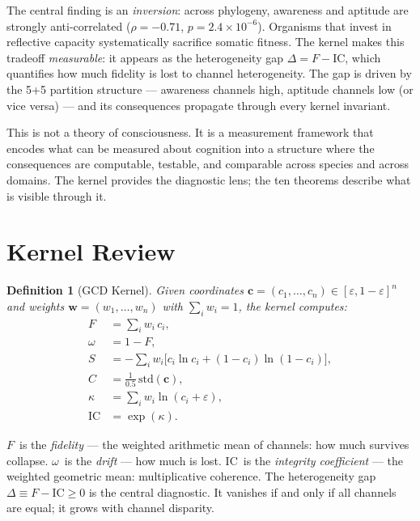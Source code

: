 \documentclass[
  aps,
  prd,
  twocolumn,
  superscriptaddress,
  nofootinbib,
  floatfix
]{revtex4-2}
\newtheorem{definition}[theorem]{Definition}
\newcommand{\eps}{\varepsilon}
\newcommand{\tvec}{\mathbf{c}}
\newcommand{\wvec}{\mathbf{w}}
\newcommand{\IC}{\mathrm{IC}}
\begin{document}
The central finding is an \emph{inversion}: across phylogeny,
awareness and aptitude are strongly anti-correlated
($\rho = -0.71$, $p = 2.4 \times 10^{-6}$).  Organisms
that invest in reflective capacity systematically sacrifice
somatic fitness.  The kernel makes this tradeoff
\emph{measurable}: it appears as the heterogeneity gap
$\Delta = F - \IC$, which quantifies how much fidelity
is lost to channel heterogeneity.  The gap is driven by the
5+5 partition structure --- awareness channels high, aptitude
channels low (or vice versa) --- and its consequences propagate
through every kernel invariant.

This is not a theory of consciousness.  It is a measurement
framework that encodes what can be measured about cognition
into a structure where the consequences are computable,
testable, and comparable across species and across domains.
The kernel provides the diagnostic lens; the ten theorems
describe what is visible through it.

\section{Kernel Review}\label{sec:kernel}

\begin{definition}[GCD Kernel]\label{def:kernel}
Given coordinates $\tvec = (c_1, \ldots, c_n) \in
[\eps, 1{-}\eps]^n$ and weights $\wvec = (w_1, \ldots, w_n)$
with $\sum_i w_i = 1$, the kernel computes:
\begin{align}
  F &= \sum_i w_i \, c_i, \label{eq:F} \\
  \omega &= 1 - F, \label{eq:omega} \\
  S &= -\sum_i w_i \bigl[c_i \ln c_i
       + (1{-}c_i)\ln(1{-}c_i)\bigr], \label{eq:S} \\
  C &= \frac{1}{0.5}\,\mathrm{std}(\tvec), \label{eq:C} \\
  \kappa &= \sum_i w_i \ln(c_i + \eps), \label{eq:kappa} \\
  \IC &= \exp(\kappa). \label{eq:IC}
\end{align}
\end{definition}

$F$~is the \emph{fidelity} --- the weighted arithmetic mean
of channels: how much survives collapse.
$\omega$~is the \emph{drift} --- how much is lost.
$\IC$~is the \emph{integrity coefficient} --- the weighted
geometric mean: multiplicative coherence.
The heterogeneity gap $\Delta \equiv F - \IC \geq 0$ is the
central diagnostic.  It vanishes if and only if all channels
are equal; it grows with channel disparity.
\end{document}
